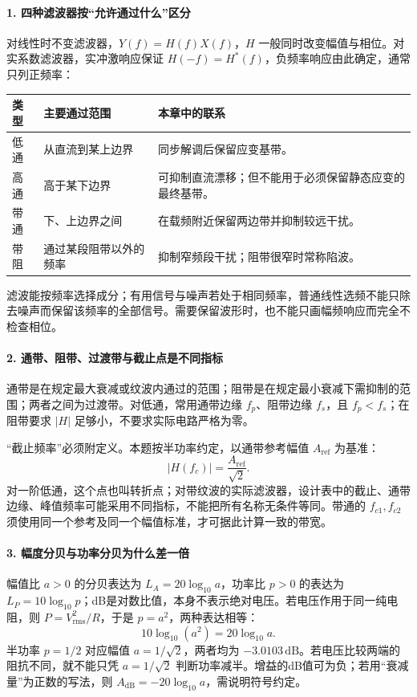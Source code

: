 \paragraph{1. 四种滤波器按“允许通过什么”区分}
对线性时不变滤波器，$Y(f)=H(f)X(f)$，$H$ 一般同时改变幅值与相位。对实系数滤波器，实冲激响应保证 $H(-f)=H^*(f)$，负频率响应由此确定，通常只列正频率：
\begin{center}\small
\begin{tabularx}{\linewidth}{@{}p{1.3cm}p{3.2cm}X@{}}
\toprule
类型 & 主要通过范围 & 本章中的联系\\
\midrule
低通 & 从直流到某上边界 & 同步解调后保留应变基带。\\
高通 & 高于某下边界 & 可抑制直流漂移；但不能用于必须保留静态应变的最终基带。\\
带通 & 下、上边界之间 & 在载频附近保留两边带并抑制较远干扰。\\
带阻 & 通过某段阻带以外的频率 & 抑制窄频段干扰；阻带很窄时常称陷波。\\
\bottomrule
\end{tabularx}
\end{center}
滤波能按频率选择成分；有用信号与噪声若处于相同频率，普通线性选频不能只除去噪声而保留该频率的全部信号。需要保留波形时，也不能只画幅频响应而完全不检查相位。

\paragraph{2. 通带、阻带、过渡带与截止点是不同指标}
通带是在规定最大衰减或纹波内通过的范围；阻带是在规定最小衰减下需抑制的范围；两者之间为过渡带。对低通，常用通带边缘 $f_p$、阻带边缘 $f_s$，且 $f_p<f_s$；在阻带要求 $|H|$ 足够小，不要求实际电路严格为零。

“截止频率”必须附定义。本题按半功率约定，以通带参考幅值 $A_{\mathrm{ref}}$ 为基准：
\[
|H(f_c)|=\frac{A_{\mathrm{ref}}}{\sqrt2}.
\]
对一阶低通，这个点也叫转折点；对带纹波的实际滤波器，设计表中的截止、通带边缘、峰值频率可能采用不同指标，不能把所有名称无条件等同。带通的 $f_{c1},f_{c2}$ 须使用同一个参考及同一个幅值标准，才可据此计算一致的带宽。

\paragraph{3. 幅度分贝与功率分贝为什么差一倍}
幅值比 $a>0$ 的分贝表达为 $L_A=20\log_{10}a$，功率比 $p>0$ 的表达为 $L_P=10\log_{10}p$；dB是对数比值，本身不表示绝对电压。若电压作用于同一纯电阻，则 $P=V_{\mathrm{rms}}^2/R$，于是 $p=a^2$，两种表达相等：
\[
10\log_{10}(a^2)=20\log_{10}a.
\]
半功率 $p=1/2$ 对应幅值 $a=1/\sqrt2$，两者均为 $-3.0103\,\mathrm{dB}$。若电压比较两端的阻抗不同，就不能只凭 $a=1/\sqrt2$ 判断功率减半。增益的dB值可为负；若用“衰减量”为正数的写法，则 $A_{\mathrm{dB}}=-20\log_{10}a$，需说明符号约定。

